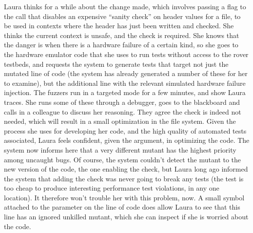 Laura thinks for a while about the change made, which involves passing a flag to the call that disables an expensive ``sanity check'' on header values for a file, to be used in contexts where the header has just been written and checked.  She thinks the current context is unsafe, and the check is required.  She knows that the danger is when there is a hardware failure of a certain kind, so she goes to the hardware emulator code that she uses to run tests without access to the rover testbeds, and requests the system to generate tests that target not just the mutated line of code (the system has already generated a number of these for her to examine), but the additional line with the relevant simulated hardware failure injection.  The fuzzers run in a targeted mode for a few minutes, and show Laura traces.  She runs some of these through a debugger, goes to the blackboard and calls in a colleague to discuss her reasoning.  They agree the check is indeed not needed, which will result in a small optimization in the file system.  Given the process she uses for developing her code, and the high quality of automated tests associated, Laura feels confident, given the argument, in optimizing the code.  The system now informs here that a very different mutant has the highest priority among uncaught bugs.  Of course, the system couldn't detect the mutant to the new version of the code, the one enabling the check, but Laura long ago informed the system that adding the check was never going to break any tests (the test is too cheap to produce interesting performance test violations, in any one location).  It therefore won't trouble her with this problem, now.  A small symbol attached to the parameter on the line of code does allow Laura to see that this line has an ignored unkilled mutant, which she can inspect if she is worried about the code.